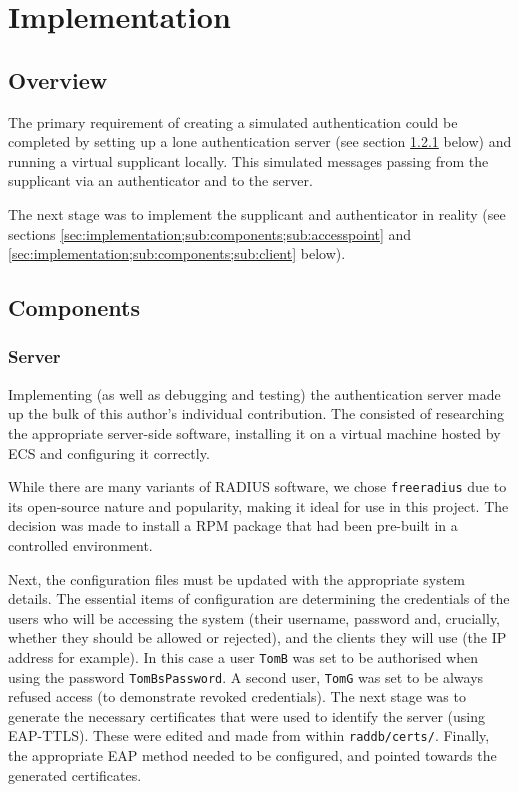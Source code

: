 \documentclass[12pt,a4paper,titlepage]{article}
\begin{document}
\newpage
\section{Implementation}

\subsection{Overview}
The primary requirement of creating a simulated authentication could be completed by setting up a lone authentication server (see section \ref{sec:implementation;sub:components;sub:server} below) and running a virtual supplicant locally. This simulated messages passing from the supplicant via an authenticator and to the server.

The next stage was to implement the supplicant and authenticator in reality (see sections \ref{sec:implementation;sub:components;sub:accesspoint} and \ref{sec:implementation;sub:components;sub:client} below).

\subsection{Components}

\subsubsection{Server}
\label{sec:implementation;sub:components;sub:server}
Implementing (as well as debugging and testing) the authentication server made up the bulk of this author's individual contribution. The consisted of researching the appropriate server-side software, installing it on a virtual machine hosted by ECS and configuring it correctly. 

While there are many variants of RADIUS software, we chose \texttt{freeradius} due to its open-source nature and popularity, making it ideal for use in this project. The decision was made to install a RPM package that had been pre-built in a controlled environment.

Next, the configuration files must be updated with the appropriate system details. The essential items of configuration are determining the credentials of the users who will be accessing the system (their username, password and, crucially, whether they should be allowed or rejected), and the clients they will use (the IP address for example). In this case a user \texttt{TomB} was set to be authorised when using the password \texttt{TomBsPassword}. A second user, \texttt{TomG} was set to be always refused access (to demonstrate revoked credentials). The next stage was to generate the necessary certificates that were used to identify the server (using EAP-TTLS). These were edited and made from within \texttt{raddb/certs/}. Finally, the appropriate EAP method needed to be configured, and pointed towards the generated certificates.
\end{document}
